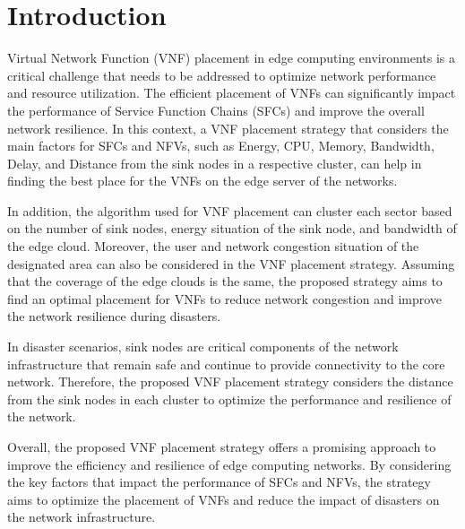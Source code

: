 \chapter{Introduction}
\newline

Virtual Network Function (VNF) placement in edge computing environments is a critical challenge that needs to be addressed to optimize network performance and resource utilization. The efficient placement of VNFs can significantly impact the performance of Service Function Chains (SFCs) and improve the overall network resilience. In this context, a VNF placement strategy that considers the main factors for SFCs and NFVs, such as Energy, CPU, Memory, Bandwidth, Delay, and Distance from the sink nodes in a respective cluster, can help in finding the best place for the VNFs on the edge server of the networks.

In addition, the algorithm used for VNF placement can cluster each sector based on the number of sink nodes, energy situation of the sink node, and bandwidth of the edge cloud. Moreover, the user and network congestion situation of the designated area can also be considered in the VNF placement strategy. Assuming that the coverage of the edge clouds is the same, the proposed strategy aims to find an optimal placement for VNFs to reduce network congestion and improve the network resilience during disasters.

In disaster scenarios, sink nodes are critical components of the network infrastructure that remain safe and continue to provide connectivity to the core network. Therefore, the proposed VNF placement strategy considers the distance from the sink nodes in each cluster to optimize the performance and resilience of the network.

Overall, the proposed VNF placement strategy offers a promising approach to improve the efficiency and resilience of edge computing networks. By considering the key factors that impact the performance of SFCs and NFVs, the strategy aims to optimize the placement of VNFs and reduce the impact of disasters on the network infrastructure.

